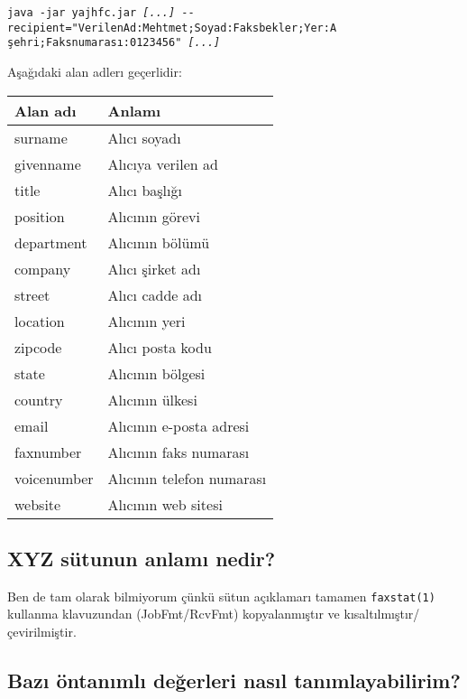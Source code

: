 \documentclass[a4paper,10pt]{scrartcl}
\begin{document}
\texttt{java -jar yajhfc.jar \textit{[...]} -{-}recipient="VerilenAd:Mehtmet;Soyad:Faksbekler;Yer:A şehri;Faksnumarası:0123456" \textit{[...]}}

Aşağıdaki alan adlerı geçerlidir:
\begin{center}
\begin{tabular}{|l|p{}|}
\hline
\bfseries Alan adı & \bfseries Anlamı \\
\hline\hline
\ttfamily surname & Alıcı soyadı\\\hline
\ttfamily givenname & Alıcıya verilen ad \\\hline
\ttfamily title & Alıcı başlığı \\\hline
\ttfamily position & Alıcının görevi \\\hline
\ttfamily department & Alıcının bölümü\\\hline
\ttfamily company & Alıcı şirket adı\\\hline
\ttfamily street & Alıcı cadde adı \\\hline
\ttfamily location & Alıcının yeri\\\hline
\ttfamily zipcode & Alıcı posta kodu \\\hline
\ttfamily state & Alıcının bölgesi\\\hline
\ttfamily country & Alıcının ülkesi\\\hline
\ttfamily email & Alıcının e-posta adresi\\\hline
\ttfamily faxnumber & Alıcının faks numarası \\\hline
\ttfamily voicenumber & Alıcının telefon numarası \\\hline
\ttfamily website & Alıcının web sitesi\\\hline
\end{tabular}
\end{center}

\subsection{XYZ sütunun anlamı nedir?}

Ben de tam olarak bilmiyorum çünkü sütun açıklamarı 
tamamen \verb.faxstat(1). kullanma klavuzundan (JobFmt/RcvFmt) kopyalanmıştır
ve kısaltılmıştır/çevirilmiştir. 

\subsection{Bazı öntanımlı değerleri nasıl tanımlayabilirim?}
\end{document}
